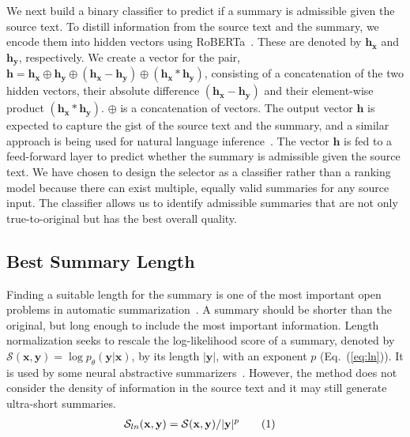 \documentclass[11pt]{article}
\newcommand\numberthis{\addtocounter{equation}{1}\tag{\theequation}}
\begin{document}
We next build a binary classifier to predict if a summary is admissible given the source text.
To distill information from the source text and the summary, we encode them into hidden vectors using RoBERTa~\cite{liu2019roberta}.
These are denoted by $\mathbf{h}_\mathbf{x}$ and $\mathbf{h}_\mathbf{y}$, respectively.
We create a vector for the pair,
$\mathbf{h} = \mathbf{h}_\mathbf{x} \oplus \mathbf{h}_\mathbf{y} \oplus (\mathbf{h}_\mathbf{x} - \mathbf{h}_\mathbf{y}) \oplus (\mathbf{h}_\mathbf{x} * \mathbf{h}_\mathbf{y})$, 
consisting of a concatenation of the two hidden vectors, their absolute difference $(\mathbf{h}_\mathbf{x} - \mathbf{h}_\mathbf{y})$ and their element-wise product $(\mathbf{h}_\mathbf{x} * \mathbf{h}_\mathbf{y})$.
$\oplus$ is a concatenation of vectors.
The output vector $\mathbf{h}$ is expected to capture the gist of the source text and the summary,
and a similar approach is being used for natural language inference~\cite{chen-etal-2018-neural}.
The vector $\mathbf{h}$ is fed to a feed-forward layer to predict whether the summary is admissible given the source text.
We have chosen to design the selector as a classifier rather than a ranking model because there can exist multiple, equally valid summaries for any source input.
The classifier allows us to identify admissible summaries that are not only true-to-original but has the best overall quality.



\subsection{Best Summary Length}

Finding a suitable length for the summary is one of the most important open problems in automatic summarization~\cite{shapira-etal-2018-evaluating,sun-etal-2019-compare}.
A summary should be shorter than the original, but long enough to include the most important information.
Length normalization seeks to rescale the log-likelihood score of a summary, denoted by $\mathcal{S}(\mathbf{x}, \mathbf{y}) = \log p_\theta(\mathbf{y}|\mathbf{x})$, by its length $|\mathbf{y}|$, with an exponent $p$ (Eq.~(\ref{eq:ln})).
It is used by some neural abstractive summarizers~\cite{see-etal-2017-get,lewis-etal-2020-bart}.
However, the method does not consider the density of information in the source text and it may still generate ultra-short summaries. 
\begin{align*}
\mathcal{S}_{ln}(\mathbf{x},\mathbf{y}) &= \mathcal{S}(\mathbf{x},\mathbf{y})/|\mathbf{y}|^p
\numberthis\label{eq:ln}
\end{align*}
\end{document}
